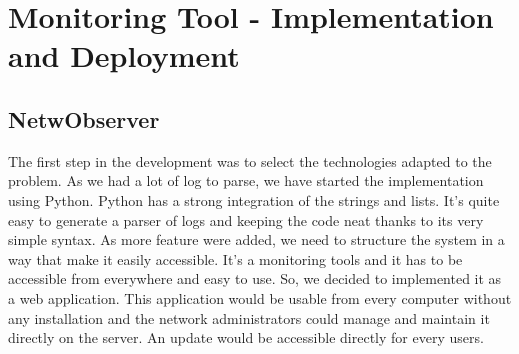 \chapter{Monitoring Tool - Implementation and Deployment} %

\label{Chapter4} %


\section{NetwObserver}
The first step in the development was to select the technologies adapted to the problem. As we had a lot of log to parse, we have started the implementation using Python. Python has a strong integration of the strings and lists. It's quite easy to generate a parser of logs and keeping the code neat thanks to its very simple syntax.
As more feature were added, we need to structure the system in a way that make it easily accessible. It's a monitoring tools and it has to be accessible from everywhere and easy to use. So, we decided to implemented it as a web application. This application would be usable from every computer without any installation and the network administrators could manage and maintain it directly on the server. An update would be accessible directly for every users.

